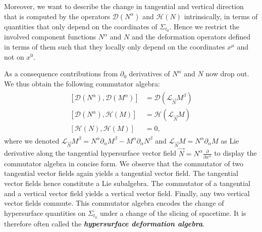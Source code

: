 Moreover, we want to describe the change in tangential and vertical direction that is computed by the operators $\mathcal{D}(N^{\alpha})$ and $\mathcal{H}(N)$ intrinsically, in terms of quantities that only depend on the coordinates of $\Sigma_{t_0}$.
Hence we restrict the involved component functions $N^{\alpha}$ and $N$ and the deformation operators defined in terms of them such that they locally only depend on the coordinates $x^{\mu}$ and not on $x^0$.
\begin{comment}
The corresponding tangential and vertical vector fields are given by $\mathcal{D}(N^{\alpha})$ and $\mathcal{H}(N)$ can then be interpreted as tangential and vertical deformation operators defined on $\Sigma_{t_0}$. Acting on hypersurface quantities, they compute the infinitesimal change in tangential and vertical direction. Note that the action of vector fields on hypersurface quantities describes their infinitesimal change under diffeomorphisms. Hence by the arguments provided before the action of vector fields on hypersurface quantities describes their infinitesimal change under a change of slicing. The deformation operators $\mathcal{D}(N^{\alpha})$ and $\mathcal{H}(N)$ defined on $\Sigma_{t_0}$ encode contributions to this change in tangential and vertical direction.
\end{comment}
As a consequence contributions from $\partial_0$ derivatives of $N^{\alpha}$ and $N$ now drop out.
We thus obtain the following commutator algebra: 
\begin{align}\label{Alg}
    \begin{aligned}
    \left[ \mathcal{D}(N^{\alpha}), \mathcal{D}(M^{\alpha}) \right] &= \mathcal{D}(\mathcal{L}_{\vec{N}}M^{\beta}) \\
    \left[ \mathcal{D}(N^{\alpha}), \mathcal{H}(M) \right] &= \mathcal{H}(\mathcal{L}_{\vec{N}}M)\\
    \left[ \mathcal{H}(N), \mathcal{H}(M) \right] &= 0,
    \end{aligned}
\end{align}
where we denoted $\mathcal{L}_{\Vec{N}}M^{\beta} = N^\alpha \partial_{\alpha}M^{\beta} - M^{\alpha} \partial_{\alpha} N^{\beta}$ and $\mathcal{L}_{\Vec{N}}M = N^{\alpha} \partial_{\alpha} M$ as Lie derivative along the tangential hypersurface vector field $\vec{N} = N^{\alpha} \frac{\partial}{\partial x^{\alpha}}$ to display the commutator algebra in concise form.
We observe that the commutator of two tangential vector fields again yields a tangential vector field. The tangential vector fields hence constitute a Lie subalgebra. 
The commutator of a tangential and a vertical vector field yields a vertical vector field.
Finally, any two vertical vector fields commute. This commutator algebra encodes the change of hypersurface quantities on $\Sigma_{t_0}$ under a change of the slicing of spacetime. It is therefore often called the \textit{\textbf{hypersurface deformation algebra}}.

